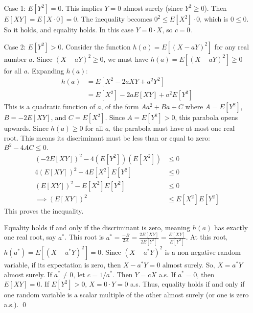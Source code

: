 \documentclass[11pt]{article}
\renewenvironment{proof}{{\bfseries Proof.}}{\qed\par\bigskip}
\begin{document}
\begin{proof}
Case 1: $E[Y^2] = 0$. This implies $Y=0$ almost surely (since $Y^2 \ge 0$). Then $E[XY] = E[X \cdot 0] = 0$. The inequality becomes $0^2 \le E[X^2] \cdot 0$, which is $0 \le 0$. So it holds, and equality holds. In this case $Y = 0 \cdot X$, so $c=0$.

Case 2: $E[Y^2] > 0$. Consider the function $h(a) = E[(X-aY)^2]$ for any real number $a$.
Since $(X-aY)^2 \ge 0$, we must have $h(a) = E[(X-aY)^2] \ge 0$ for all $a$.
Expanding $h(a)$:
\begin{align*}
h(a) &= E[X^2 - 2aXY + a^2Y^2] \\
     &= E[X^2] - 2aE[XY] + a^2E[Y^2]
\end{align*}
This is a quadratic function of $a$, of the form $Aa^2 + Ba + C$ where $A = E[Y^2]$, $B = -2E[XY]$, and $C = E[X^2]$. Since $A = E[Y^2] > 0$, this parabola opens upwards.
Since $h(a) \ge 0$ for all $a$, the parabola must have at most one real root. This means its discriminant must be less than or equal to zero: $B^2 - 4AC \le 0$.
\begin{align*}
(-2E[XY])^2 - 4(E[Y^2])(E[X^2]) &\le 0 \\
4(E[XY])^2 - 4E[X^2]E[Y^2] &\le 0 \\
(E[XY])^2 - E[X^2]E[Y^2] &\le 0 \\
\implies (E[XY])^2 &\le E[X^2]E[Y^2]
\end{align*}
This proves the inequality.

Equality holds if and only if the discriminant is zero, meaning $h(a)$ has exactly one real root, say $a^*$. This root is $a^* = \frac{-B}{2A} = \frac{2E[XY]}{2E[Y^2]} = \frac{E[XY]}{E[Y^2]}$.
At this root, $h(a^*) = E[(X-a^*Y)^2] = 0$.
Since $(X-a^*Y)^2$ is a non-negative random variable, if its expectation is zero, then $X-a^*Y = 0$ almost surely.
So, $X = a^*Y$ almost surely.
If $a^* \neq 0$, let $c = 1/a^*$. Then $Y=cX$ a.s.
If $a^*=0$, then $E[XY]=0$. If $E[Y^2]>0$, $X=0 \cdot Y = 0$ a.s.
Thus, equality holds if and only if one random variable is a scalar multiple of the other almost surely (or one is zero a.s.).
\end{proof}
\end{document}
